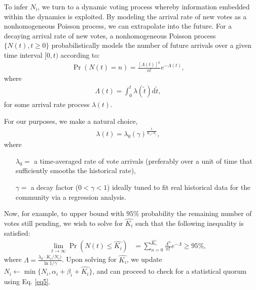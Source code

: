 \documentclass[chi_draft]{sigchi}
\begin{document}
To infer $N_i$, we turn to a dynamic voting process whereby information embedded within the dynamics is exploited.  By modeling the arrival rate of new votes as a nonhomogeneous Poisson process, we can extrapolate into the future.  For a decaying arrival rate of new votes, a nonhomogeneous Poisson process $\{N(t),t\geq 0\}$ probabilistically models the number of future arrivals over a given time interval $[0,t)$ according to:
\begin{align*}
\Pr(N(t)=n)={\frac {[\Lambda (t)]^{n}}{n!}}e^{-\Lambda (t)},
\end{align*}
where
\begin{align*}
\Lambda (t)=\int _{0}^{t}\lambda (\tilde{t})\mathrm{d}\tilde{t},
\end{align*}
for some arrival rate process $\lambda (t)$.

For our purposes, we make a natural choice,
\begin{align}\label{eq6}
\lambda (t) = \lambda_0 {(\gamma)}^{\frac{t}{K_i/N_i}},
\end{align}
where
\begin{description}
\begin{itemize}
\item[$\lambda_0 =$] a time-averaged rate of vote arrivals (preferably over a unit of time that sufficiently smooths the historical rate),
\item[$\gamma =$] a decay factor ($0 < \gamma < 1$) ideally tuned to fit real historical data for the community via a regression analysis.
\end{itemize}
\end{description}
Now, for example, to upper bound with $95\%$ probability the remaining number of votes still pending, we wish to solve for $\hat{K_i}$ such that the following inequality is satisfied:
\begin{align}\label{eq7}
\lim_{t\rightarrow \infty}\Pr\left(N(t)\leq \hat{K_i}\right) & = \sum_{n=0}^{\hat{K_i}} \frac{\Lambda^n}{n!}e^{-\Lambda} \geq 95\%,
\end{align}
where $\Lambda = \frac{\lambda_0 \cdot K_i/N_i)}{\ln{1/\gamma}}$.
Upon solving for $\hat{K_i}$, we update $N_i \leftarrow \min\{N_i,\alpha_i + \beta_i + \hat{K_i}\}$, and can proceed to check for a statistical quorum using Eq. \ref{eq5}.


\end{document}

